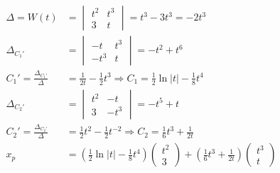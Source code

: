 \documentclass{article}
\begin{document}
\begin{align*}
    \Delta = W(t)                     & =\begin{vmatrix}
                                             t^2 & t^3 \\
                                             3   & t
                                         \end{vmatrix} = t^3 - 3t^3=-2t^3                                                             \\
    \Delta_{C_1'}                     & =\begin{vmatrix}
                                             -t   & t^3 \\
                                             -t^3 & t
                                         \end{vmatrix} = -t^2+t^6                                                                     \\
    C_1'=\frac{\Delta_{C_1'}}{\Delta} & =\frac{1}{2t} - \frac{1}{2}t^3 \Rightarrow C_1=\frac{1}{2}\ln|t|-\frac{1}{8}t^4               \\
    \Delta_{C_2'}                     & =\begin{vmatrix}
                                             t^2 & -t   \\
                                             3   & -t^3
                                         \end{vmatrix} = -t^5+t                                                                       \\
    C_2'=\frac{\Delta_{C_2'}}{\Delta} & =\frac{1}{2}t^2 - \frac{1}{2}t^{-2} \Rightarrow C_2=\frac{1}{6}t^3+\frac{1}{2t}               \\
    x_p                               & = (\frac{1}{2}\ln|t|-\frac{1}{8}t^4)\begin{pmatrix}
                                                                                t^2 \\
                                                                                3
                                                                            \end{pmatrix}+(\frac{1}{6}t^3+\frac{1}{2t})\begin{pmatrix}
                                                                                                                           t^3 \\
                                                                                                                           t
                                                                                                                       \end{pmatrix}
\end{align*}
\end{document}

